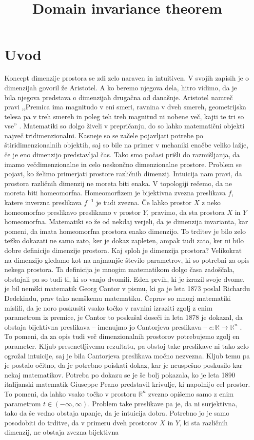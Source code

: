 \documentclass[mat1]{fmfdelo}
\title{Domain invariance theorem}
\newcommand{\R}{\mathbb R}
\newcommand{\0}{\underline{0}}
\begin{document}
\section{Uvod}
Koncept dimenzije prostora se zdi zelo naraven in intuitiven. V svojih zapisih je o dimenzijah govoril že Aristotel. A ko beremo njegova dela, hitro vidimo, da je bila njegova predstava o dimenzijah drugačna od današnje. Aristotel namreč pravi ,,Premica ima magnitudo v eni smeri, ravnina v dveh smereh, geometrijska telesa pa v treh smereh in poleg teh treh magnitud ni nobene več, kajti te tri so vse'' \cite[Str. 1, moj prevod]{4dim}. Matematiki so dolgo živeli v prepričanju, do so lahko matematični objekti največ tridimenzionalni. Kasneje so se začele pojavljati potrebe po štiridimenzionalnih objektih, saj so bile na primer v mehaniki enačbe veliko lažje, če je eno dimenzijo predstavljal čas. Tako smo počasi prišli do razmišljanja, da imamo večdimenzionalne in celo neskončno dimenzionalne prostore. Problem se pojavi, ko želimo primerjati prostore različnih dimenzij. Intuicija nam pravi, da prostora različnih dimenzij ne moreta biti enaka. V topologiji rečemo, da ne moreta biti homeomorfna. Homeomorfizem je bijektivna zvezna preslikava $f$, katere inverzna preslikava $f^{-1}$ je tudi zvezna. Če lahko prostor $X$ z neko homeomorfno preslikavo preslikamo v prostor $Y$, pravimo, da sta prostora $X$ in $Y$ homeomorfna. Matematiki so že od nekdaj verjeli, da je dimenzija invarianta, kar pomeni, da imata homeomorfna prostora enako dimenzijo. To trditev je bilo zelo težko dokazati ne samo zato, ker je dokaz zapleten, ampak tudi zato, ker ni bilo dobre definicije dimenzije prostora. Kaj sploh je dimenzija prostora? Velikokrat na dimenzijo gledamo kot na najmanjše število parametrov, ki so potrebni za opis nekega prostora. Ta definicija je mnogim matematikom dolgo časa zadoščala, obstajali pa so tudi ti, ki so vanjo dvomili. Eden prvih, ki je izrazil svoje dvome, je bil nemški matematik Georg Cantor v pismu, ki ga je leta 1873 poslal Richardu Dedekindu, prav tako nemškemu matematiku. Čeprav so mnogi matematiki mislili, da je noro poskusiti vsako točko v ravnini izraziti zgolj z enim parametrom iz premice, je Cantor to poskušal doseči in leta 1878 je dokazal, da obstaja bijektivna preslikava -- imenujmo jo Cantorjeva preslikava -- $c : \R \to \R^n$ \cite{Gouvea2011}. To pomeni, da za opis tudi več dimenzionalnih prostorov potrebujemo zgolj en parameter. Kljub presenetljivemu rezultatu, pa obstoj take preslikave ni tako zelo ogrožal intuicije, saj je bila Cantorjeva preslikava močno nezvezna. Kljub temu pa je postalo očitno, da je potrebno poiskati dokaz, kar je neuspešno poskusilo kar nekaj matematikov. Potreba po dokazu se je še bolj pokazala, ko je leta 1890 italijanski matematik Giuseppe Peano predstavil krivulje, ki napolnijo cel prostor. To pomeni, da lahko vsako točko v prostoru $\R^n$ zvezno opišemo samo z enim parametrom $t \in (-\infty, \infty)$. Problem take preslikave pa je, da ni surjektivna, tako da še vedno obstaja upanje, da je intuicija dobra. Potrebno jo je samo posodobiti do trditve, da v primeru dveh prostorov $X$ in $Y$, ki sta različnih dimenzij, ne obstaja zvezna bijektivna 
\end{document}

